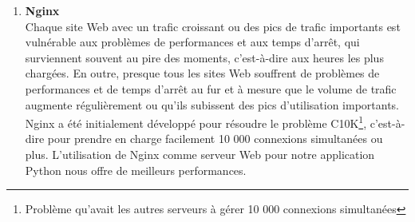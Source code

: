 	    \begin{enumerate}
	      \item \textbf{Nginx}
		\\Chaque site Web avec un trafic croissant ou des pics de trafic importants est vulnérable aux problèmes de performances et aux temps d'arrêt, qui surviennent souvent au pire des moments, c'est-à-dire aux heures les plus chargées. En outre, presque tous les sites Web souffrent de problèmes de performances et de temps d'arrêt au fur et \`a mesure que le volume de trafic augmente régulièrement ou qu'ils subissent des pics d'utilisation importants. Nginx a été initialement développé pour résoudre le problème C10K\footnote{Probl\`eme qu'avait les autres serveurs \`a g\'erer 10 000 connexions simultanées}, c’est-à-dire pour prendre en charge facilement 10 000 connexions simultanées ou plus. L'utilisation de Nginx comme serveur Web pour notre application Python nous offre de meilleurs performances.


\end{enumerate}
